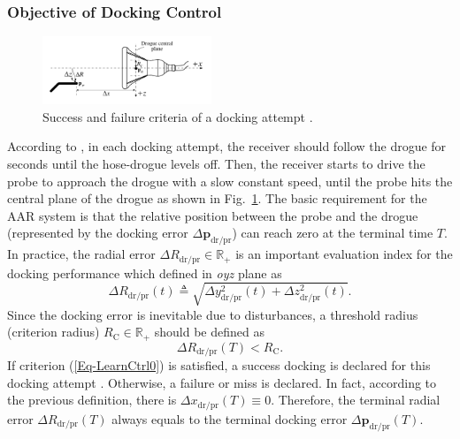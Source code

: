 \subsubsection{Objective of Docking Control}

\begin{figure}[tbh]
	\centering \includegraphics[width=0.45\textwidth]{Figures/Figs_Ch9/CaptureMissCriterion1}
	\caption{Success and failure criteria of a docking attempt \cite{Dibley-2007-2}.}
	\label{Fig_CaptureMissCriterion} 
\end{figure}

According to \cite{Dibley-2007-2}, in each docking attempt, the receiver
should follow the drogue for seconds until the hose-drogue levels
off. Then, the receiver starts to drive the probe to approach the
drogue with a slow constant speed, until the probe hits the central
plane of the drogue as shown in Fig.~\ref{Fig_CaptureMissCriterion}.
The basic requirement for the AAR system is that the relative position
between the probe and the drogue (represented by the docking error
$\Delta{\mathbf{p}}_{\text{dr/pr}}$) can reach zero at the terminal
time $T$. In practice, the radial error $\Delta R_{\text{dr/pr}}\in%
\mathbb{R}%
_{+}$ is an important evaluation index for the docking performance which
defined in \textit{oyz} plane as
\begin{equation}
\Delta R_{\text{dr/pr}}\left(t\right)\triangleq\sqrt{\Delta y_{\text{dr/pr}}^{2}\left(t\right)+\Delta z_{\text{dr/pr}}^{2}\left(t\right)}.
\end{equation}
Since the docking error is inevitable due to disturbances, a threshold
radius (criterion radius) $R_{\text{C}}\in%
\mathbb{R}%
_{+}$ should be defined as
\begin{equation}
\Delta R_{\text{dr/pr}}\left(T\right)<R_{\text{C}}.\label{Eq-LearnCtrl0}
\end{equation}
If criterion (\ref{Eq-LearnCtrl0}) is satisfied, a success docking
is declared for this docking attempt \cite{Dibley-2007-2}. Otherwise,
a failure or miss is declared. In fact, according to the previous
definition, there is $\Delta x_{\text{dr/pr}}\left(T\right)\equiv0$.
Therefore, the terminal radial error $\Delta R_{\text{dr/pr}}\left(T\right)$
always equals to the terminal docking error $\Delta{\mathbf{p}}_{\text{dr/pr}}\left(T\right)$.


